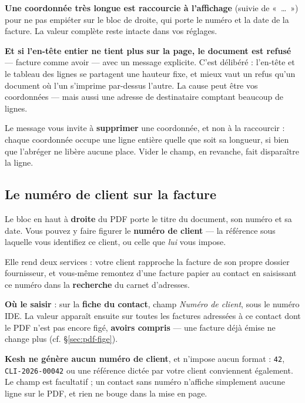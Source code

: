\documentclass[a4paper,11pt,oneside]{article}
\begin{document}
\begin{keshwarning}
\textbf{Une coordonnée très longue est raccourcie à l'affichage} (suivie de «~\ldots~») pour ne pas empiéter sur le bloc de droite, qui porte le numéro et la date de la facture. La valeur complète reste intacte dans vos réglages.

\textbf{Et si l'en-tête entier ne tient plus sur la page, le document est refusé} --- facture comme avoir --- avec un message explicite. C'est délibéré : l'en-tête et le tableau des lignes se partagent une hauteur fixe, et mieux vaut un refus qu'un document où l'un s'imprime par-dessus l'autre. La cause peut être vos coordonnées --- mais aussi une adresse de destinataire comptant beaucoup de lignes.

Le message vous invite à \textbf{supprimer} une coordonnée, et non à la raccourcir : chaque coordonnée occupe une ligne entière quelle que soit sa longueur, si bien que l'abréger ne libère aucune place. Vider le champ, en revanche, fait disparaître la ligne.
\end{keshwarning}

\subsection{Le numéro de client sur la facture}\label{sec:numero-client}

Le bloc en haut à \textbf{droite} du PDF porte le titre du document, son numéro et sa date. Vous pouvez y faire figurer le \textbf{numéro de client} --- la référence sous laquelle vous identifiez ce client, ou celle que \emph{lui} vous impose.

Elle rend deux services : votre client rapproche la facture de son propre dossier fournisseur, et vous-même remontez d'une facture papier au contact en saisissant ce numéro dans la \textbf{recherche} du carnet d'adresses.

\textbf{Où le saisir} : sur la \textbf{fiche du contact}, champ \emph{Numéro de client}, sous le numéro IDE. La valeur apparaît ensuite sur toutes les factures adressées à ce contact dont le PDF n'est pas encore figé, \textbf{avoirs compris} --- une facture déjà émise ne change plus (cf. \S\ref{sec:pdf-fige}).

\begin{keshnote}
\textbf{Kesh ne génère aucun numéro de client}, et n'impose aucun format : \texttt{42}, \texttt{CLI-2026-00042} ou une référence dictée par votre client conviennent également. Le champ est facultatif ; un contact sans numéro n'affiche simplement aucune ligne sur le PDF, et rien ne bouge dans la mise en page.
\end{keshnote}
\end{document}
